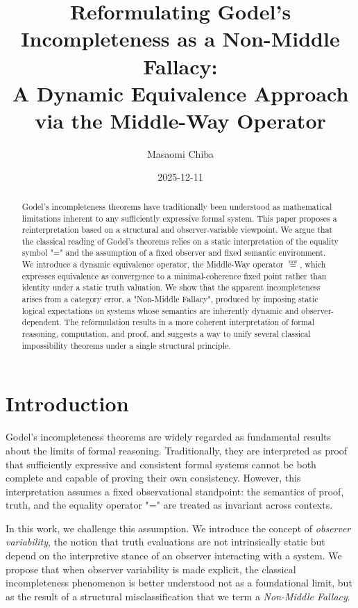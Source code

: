 \documentclass[11pt]{article}
\title{Reformulating Godel's Incompleteness as a Non-Middle Fallacy:\\
A Dynamic Equivalence Approach via the Middle-Way Operator}
\author{Masaomi Chiba}
\date{2025-12-11}
\newcommand{\mweq}{\overset{\mathrm{mw}}{=}}
\begin{document}
\maketitle

\begin{abstract}
Godel's incompleteness theorems have traditionally been understood as 
mathematical limitations inherent to any sufficiently expressive formal system. 
This paper proposes a reinterpretation based on a structural and 
observer-variable viewpoint. We argue that the classical reading of 
Godel's theorems relies on a static interpretation of the equality symbol "=" 
and the assumption of a fixed observer and fixed semantic environment. 
We introduce a dynamic equivalence operator, the Middle-Way operator 
$\mweq$, which expresses equivalence as convergence to a minimal-coherence 
fixed point rather than identity under a static truth valuation. 
We show that the apparent incompleteness arises from a category error, 
a "Non-Middle Fallacy", produced by imposing static logical expectations 
on systems whose semantics are inherently dynamic and observer-dependent. 
The reformulation results in a more coherent interpretation of 
formal reasoning, computation, and proof, and suggests a way to unify 
several classical impossibility theorems under a single structural principle.
\end{abstract}

\tableofcontents

\section{Introduction}

Godel's incompleteness theorems are widely regarded as fundamental results 
about the limits of formal reasoning. Traditionally, they are interpreted as 
proof that sufficiently expressive and consistent formal systems cannot be both 
complete and capable of proving their own consistency. However, this 
interpretation assumes a fixed observational standpoint: the semantics of 
proof, truth, and the equality operator "=" are treated as invariant across 
contexts.

In this work, we challenge this assumption. We introduce the concept of 
\emph{observer variability}, the notion that truth evaluations are not 
intrinsically static but depend on the interpretive stance of an observer 
interacting with a system. We propose that when observer variability is made 
explicit, the classical incompleteness phenomenon is better understood not as 
a foundational limit, but as the result of a structural misclassification that 
we term a \emph{Non-Middle Fallacy}.
\end{document}
